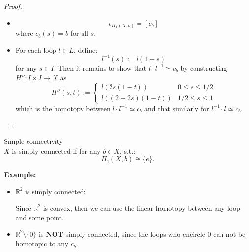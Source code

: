 \begin{proof}
\begin{itemize}
\begin{itemize}
            Take $[u],[v],[w] \in \Pi_1 (X,b)$. Define $H' : I \times I \rightarrow X$ by
            $$H' (s,t) := \begin{cases}
                u(\frac{4s}{2-t}) &0 \leq s \leq \frac{1}{2} - \frac{1}{4}t\\
                v(4s-2 +t) &\frac{1}{2} - \frac{1}{4}t \leq s \leq \frac{3}{4} - \frac{1}{4}t\\
                w(4s - 3 + \frac{t}{1+t}) &\frac{3}{4} - \frac{1}{4}t \leq s \leq 1
            \end{cases}$$
            which is easy to check that $H'$ is the homotopy between $(u \cdot v) \cdot w \simeq u \cdot (v \cdot w)$. Since $u(0) = u(1) = v(0) = v(1) = w(0) = w(1) =b$, then we have
            $$([u] * [v] ) * [w] = [u] * ([v] * [w]).$$
        \end{itemize}
        \item $$e_{\Pi_1(X,b)} = [c_b]$$
        where $c_b(s) = b$ for all $s$.
        \item For each loop $l \in L$, define:
        $$l^{-1} (s) := l(1-s)$$
        for any $s \in I$. Then it remains to show that $l \cdot l^{-1} \simeq c_b$ by constructing $H''  : I \times I \rightarrow X$ as
        $$H'' (s,t) := \begin{cases}
            l(2s(1-t)) &0\leq s \leq 1/2\\
            l ((2-2s)(1-t)) &1/2 \leq s \leq 1
        \end{cases}$$
        which is the homotopy between $l \cdot l^{-1} \simeq c_b$ and that similarly for $ l^{-1} \cdot l \simeq c_b$.
    \end{itemize}
\end{proof}

\begin{definition}{Simple connectivity}\\
$X$ is simply connected if for any $b \in X$, s.t.:
$$\Pi_1 (X,b) \cong \{ e\}.$$
\end{definition}

\noindent\textbf{Example:}
\begin{itemize}
    \item $\mathbb{R}^2$ is simply connected: 
    
    Since $\mathbb{R}^2$ is convex, then we can use the linear homotopy between any loop and some point.
    \item $\mathbb{R}^2 \setminus \{0\}$ is \textbf{NOT} simply connected, since the loops who encircle $0$ can not be homotopic to any $c_b$.
\end{itemize}

